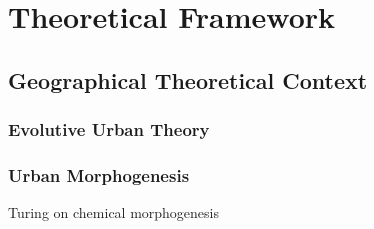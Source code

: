 



\chapter{Theoretical Framework} %

\label{ch:theory} %








\section{Geographical Theoretical Context}


\subsection{Evolutive Urban Theory}







\subsection{Urban Morphogenesis}


Turing on chemical morphogenesis~\cite{turing1952chemical}








